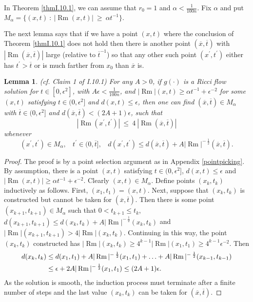 \documentclass[12pt]{amsart}
\newcommand{\Rm}{\operatorname{Rm}}
\numberwithin{equation}{section}
\theoremstyle{plain}
\newtheorem{lemma}[equation]{Lemma}
\theoremstyle{definition}
\theoremstyle{remark}
\begin{document}
In Theorem \ref{thmI.10.1}, 
we can assume that $r_0 = 1$ and $\alpha < \frac{1}{100n}$. Fix $\alpha$
and put $M_\alpha = \{(x,t) \: : \: |\Rm(x,t)| \: \ge \: \alpha t^{-1} \}$.

The next lemma says that if we have a point $(x,t)$ where the conclusion of
Theorem \ref{thmI.10.1} does not hold then there is another point
$(\overline{x}, \overline{t})$ with $|\Rm(\overline{x}, \overline{t})|$
large (relative to $\overline{t}^{-1}$) so that any other such point
$(x^\prime, t^\prime)$ either has 
$t^\prime > \overline{t}$
or is much farther from $x_0$ than $\overline{x}$ is.

\begin{lemma} (cf. Claim 1 of I.10.1) \label{Claim 1}
For any $A > 0$, if $g(\cdot)$ is a Ricci flow solution for
$t \in [0, \epsilon^2]$, with $A \epsilon < \frac{1}{100n}$, and
$|\Rm|(x,t) \ge \alpha t^{-1} + \epsilon^{-2}$ 
for some
$(x,t)$ satisfying 
$t \in (0, \epsilon^2]$
and $d(x,t) \le \epsilon$, then
one can find $(\overline{x}, \overline{t}) \in M_\alpha$ with
$\overline{t} \in (0, \epsilon^2]$ and $d(\overline{x}, \overline{t}) <
(2A+1) \epsilon$, such that
\begin{equation} \label{I.(10.1)}
|\Rm(x^\prime,t^\prime)| \: \le \: 4 \: |\Rm(\overline{x}, \overline{t})|
\end{equation}
whenever
\begin{equation} \label{I.(10.2)}
(x^\prime, t^\prime) \in M_\alpha, \: \: \: \: t^\prime \in (0, \overline{t}],
 \: \: \: \: d(x^\prime, t^\prime) \le d(\overline{x}, \overline{t}) +
A |\Rm|^{- \: \frac12}(\overline{x}, \overline{t}).
\end{equation}
\end{lemma}
\begin{proof}
The proof is by a point selection argument as in
Appendix \ref{pointpicking}. By assumption, there is a point $(x,t)$
satisfying $t \in (0, \epsilon^2]$, 
$d(x, t) \le \epsilon$ and
$|\Rm(x, t)| \ge \alpha t^{-1} + \epsilon^{-2}$. 
Clearly $(x,t) \in M_\alpha$. Define points
$(x_k, t_k)$ inductively as follows. First, $(x_1, t_1) = (x, t)$. Next,
suppose that $(x_k, t_k)$ is constructed but cannot be taken for
$(\overline{x}, \overline{t})$. Then there is some point
$(x_{k+1}, t_{k+1}) \in M_\alpha$ such that $0 < t_{k+1} \le t_k$,
$d(x_{k+1}, t_{k+1}) \le d(x_k, t_k) + A |\Rm|^{- \: \frac12}(x_k,t_k)$ and
$|\Rm|(x_{k+1},t_{k+1}) > 4|\Rm|(x_k, t_k)$. Continuing in this way,
the point $(x_k, t_k)$ constructed has
$|\Rm|(x_k, t_k) \ge 4^{k-1} |\Rm|(x_1, t_1) \ge 4^{k-1} \epsilon^{-2}$.
Then 
\begin{align}
d(x_k, t_k) & \le d(x_1, t_1) + A |\Rm|^{- \: \frac12}(x_1, t_1) + \ldots
+ A |\Rm|^{- \: \frac12}(x_{k-1}, t_{k-1}) \\
& \le \epsilon + 2A
|\Rm|^{- \: \frac12}(x_1, t_1) \le (2A+1) \epsilon. \notag
\end{align}
As the solution is smooth, the induction process must terminate after a 
finite number of steps and the last value $(x_k, t_k)$ can be taken
for $(\overline{x}, \overline{t})$.
\end{proof}
\end{document}
